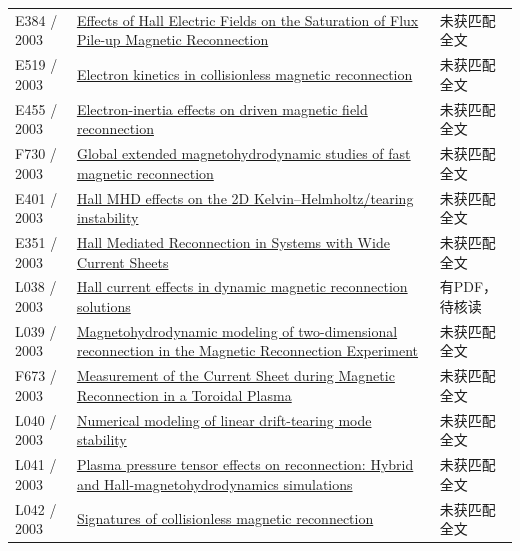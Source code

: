 \begin{longtable}{P{24mm}P{97mm}P{27mm}}
E384 / 2003 & \href{http://ui.adsabs.harvard.edu/abs/2003EAEJA.....7302D/abstract}{Effects of Hall Electric Fields on the Saturation of Flux Pile-up Magnetic Reconnection} & 未获匹配全文\\

E519 / 2003 & \href{https://doi.org/10.1088/0741-3335/45/12a/020}{Electron kinetics in collisionless magnetic reconnection} & 未获匹配全文\\

E455 / 2003 & \href{https://doi.org/10.1063/1.1615242}{Electron-inertia effects on driven magnetic field reconnection} & 未获匹配全文\\

F730 / 2003 & \href{https://doi.org/10.1063/1.1566026}{Global extended magnetohydrodynamic studies of fast magnetic reconnection} & 未获匹配全文\\

E401 / 2003 & \href{https://doi.org/10.1016/s0375-9601(02)01807-8}{Hall MHD effects on the 2D Kelvin–Helmholtz/tearing instability} & 未获匹配全文\\

E351 / 2003 & \href{http://ui.adsabs.harvard.edu/abs/2003APS..DPPGP1117S/abstract}{Hall Mediated Reconnection in Systems with Wide Current Sheets} & 未获匹配全文\\

L038 / 2003 & \href{https://doi.org/10.1063/1.1590980}{Hall current effects in dynamic magnetic reconnection solutions} & 有PDF，待核读\\

L039 / 2003 & \href{https://doi.org/10.1063/1.1591182}{Magnetohydrodynamic modeling of two-dimensional reconnection in the Magnetic Reconnection Experiment} & 未获匹配全文\\

F673 / 2003 & \href{https://doi.org/10.1103/physrevlett.90.035003}{Measurement of the Current Sheet during Magnetic Reconnection in a Toroidal Plasma} & 未获匹配全文\\

L040 / 2003 & \href{https://doi.org/10.1063/1.1554739}{Numerical modeling of linear drift-tearing mode stability} & 未获匹配全文\\

L041 / 2003 & \href{https://doi.org/10.1063/1.1559971}{Plasma pressure tensor effects on reconnection: Hybrid and Hall-magnetohydrodynamics simulations} & 未获匹配全文\\

L042 / 2003 & \href{https://doi.org/10.1029/2002ja009699}{Signatures of collisionless magnetic reconnection} & 未获匹配全文\\


\end{longtable}
